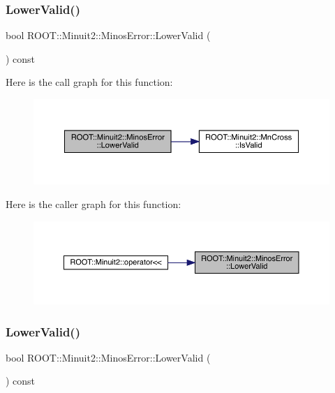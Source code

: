 \subsubsection{\texorpdfstring{LowerValid()}{LowerValid()}\hspace{0.1cm}{\footnotesize\ttfamily [1/3]}}
{\footnotesize\ttfamily bool R\+O\+O\+T\+::\+Minuit2\+::\+Minos\+Error\+::\+Lower\+Valid (\begin{DoxyParamCaption}{ }\end{DoxyParamCaption}) const\hspace{0.3cm}{\ttfamily [inline]}}

Here is the call graph for this function\+:
\nopagebreak
\begin{figure}[H]
\begin{center}
\leavevmode
\includegraphics[width=350pt]{d2/dd1/classROOT_1_1Minuit2_1_1MinosError_a4b8c37c90bb53d98d3b4364a5ebc2228_cgraph}
\end{center}
\end{figure}
Here is the caller graph for this function\+:
\nopagebreak
\begin{figure}[H]
\begin{center}
\leavevmode
\includegraphics[width=350pt]{d2/dd1/classROOT_1_1Minuit2_1_1MinosError_a4b8c37c90bb53d98d3b4364a5ebc2228_icgraph}
\end{center}
\end{figure}
\mbox{\label{classROOT_1_1Minuit2_1_1MinosError_a4b8c37c90bb53d98d3b4364a5ebc2228}} 
\subsubsection{\texorpdfstring{LowerValid()}{LowerValid()}\hspace{0.1cm}{\footnotesize\ttfamily [2/3]}}
{\footnotesize\ttfamily bool R\+O\+O\+T\+::\+Minuit2\+::\+Minos\+Error\+::\+Lower\+Valid (\begin{DoxyParamCaption}{ }\end{DoxyParamCaption}) const\hspace{0.3cm}{\ttfamily [inline]}}

